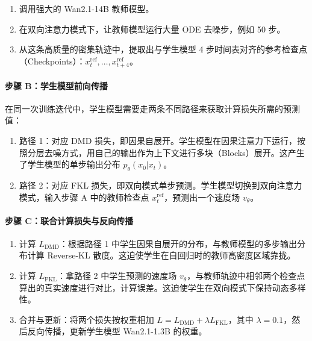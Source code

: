 \begin{enumerate}
\def\labelenumi{\arabic{enumi}.}
\tightlist
\item
  调用强大的 Wan2.1-14B 教师模型。
\item
  在双向注意力模式下，让教师模型运行大量 ODE 去噪步，例如 50 步。
\item
  从这条高质量的密集轨迹中，提取出与学生模型 4 步时间表对齐的参考检查点（Checkpoints）：\(x_t^{\mathrm{ref}},\ldots,x_{t+4}^{\mathrm{ref}}\)。
\end{enumerate}

\hypertarget{ux6b65ux9aa4-bux5b66ux751fux6a21ux578bux524dux5411ux4f20ux64ad}{%
\paragraph{步骤 B：学生模型前向传播}\label{ux6b65ux9aa4-bux5b66ux751fux6a21ux578bux524dux5411ux4f20ux64ad}}

在同一次训练迭代中，学生模型需要走两条不同路径来获取计算损失所需的预测值：

\begin{enumerate}
\def\labelenumi{\arabic{enumi}.}
\tightlist
\item
  路径 1：对应 DMD 损失，即因果自展开。学生模型在因果注意力下运行，按照分层去噪方式，用自己的输出作为上下文进行多块（Blocks）展开。这产生了学生模型的单步输出分布 \(p_\theta(x_0|x_t)\)。
\item
  路径 2：对应 FKL 损失，即双向模式单步预测。学生模型切换到双向注意力模式，输入步骤 A 中的教师检查点 \(x_t^{\mathrm{ref}}\)，预测出一个速度场 \(v_\theta\)。
\end{enumerate}

\hypertarget{ux6b65ux9aa4-cux8054ux5408ux8ba1ux7b97ux635fux5931ux4e0eux53cdux5411ux4f20ux64ad}{%
\paragraph{步骤 C：联合计算损失与反向传播}\label{ux6b65ux9aa4-cux8054ux5408ux8ba1ux7b97ux635fux5931ux4e0eux53cdux5411ux4f20ux64ad}}

\begin{enumerate}
\def\labelenumi{\arabic{enumi}.}
\tightlist
\item
  计算 \(L_{\mathrm{DMD}}\)：根据路径 1 中学生因果自展开的分布，与教师模型的多步输出分布计算 Reverse-KL 散度。这迫使学生在自回归时的教师高密度区域靠拢。
\item
  计算 \(L_{\mathrm{FKL}}\)：拿路径 2 中学生预测的速度场 \(v_\theta\)，与教师轨迹中相邻两个检查点算出的真实速度进行对比，计算误差。这迫使学生在双向模式下保持动态多样性。
\item
  合并与更新：将两个损失按权重相加 \(L=L_{\mathrm{DMD}}+\lambda L_{\mathrm{FKL}}\)，其中 \(\lambda=0.1\)，然后反向传播，更新学生模型 Wan2.1-1.3B 的权重。
\end{enumerate}


